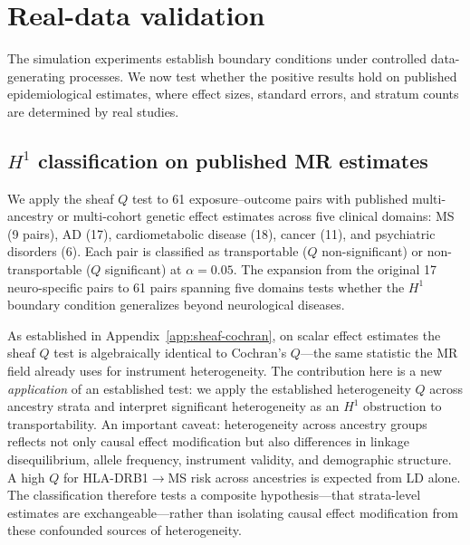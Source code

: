 \documentclass{article}
\begin{document}
\section{Real-data validation}
\label{sec:realdata}

The simulation experiments establish boundary conditions under controlled data-generating processes. We now test whether the positive results hold on published epidemiological estimates, where effect sizes, standard errors, and stratum counts are determined by real studies.

\subsection{$H^1$ classification on published MR estimates}
\label{sec:realdata-h1}

We apply the sheaf $Q$ test to 61 exposure--outcome pairs with published multi-ancestry or multi-cohort genetic effect estimates across five clinical domains: MS (9 pairs), AD (17), cardiometabolic disease (18), cancer (11), and psychiatric disorders (6). Each pair is classified as transportable ($Q$ non-significant) or non-transportable ($Q$ significant) at $\alpha = 0.05$. The expansion from the original 17 neuro-specific pairs to 61 pairs spanning five domains tests whether the $H^1$ boundary condition generalizes beyond neurological diseases.

As established in Appendix~\ref{app:sheaf-cochran}, on scalar effect estimates the sheaf $Q$ test is algebraically identical to Cochran's $Q$---the same statistic the MR field already uses for instrument heterogeneity.
The contribution here is a new \emph{application} of an established test: we apply the established heterogeneity $Q$ across ancestry strata and interpret significant heterogeneity as an $H^1$ obstruction to transportability.
An important caveat: heterogeneity across ancestry groups reflects not only causal effect modification but also differences in linkage disequilibrium, allele frequency, instrument validity, and demographic structure.
A high $Q$ for HLA-DRB1$\to$MS risk across ancestries is expected from LD alone.
The classification therefore tests a composite hypothesis---that strata-level estimates are exchangeable---rather than isolating causal effect modification from these confounded sources of heterogeneity.
\end{document}
